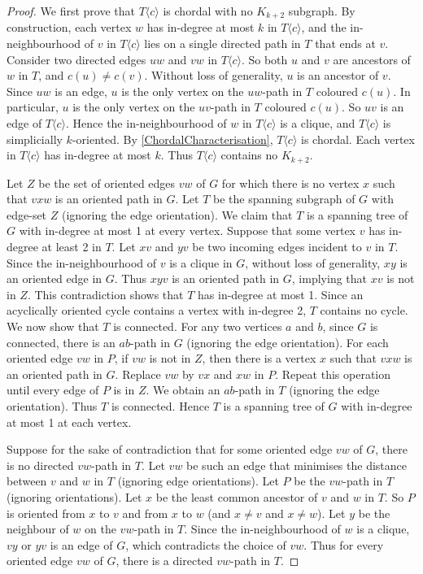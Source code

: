 \documentclass[a4paper,11pt]{article}
\theoremstyle{plain}
\theoremstyle{definition}
\newcommand{\GGG}[2]{#1\langle{#2}\rangle}
\begin{document}
\begin{proof}
We first prove that $\GGG{T}{c}$ is chordal with no $K_{k+2}$ subgraph. By construction, each vertex $w$ has in-degree at most $k$ in $\GGG{T}{c}$, and the in-neighbourhood of $v$ in $\GGG{T}{c}$ lies on a single directed path in $T$ that ends at $v$. Consider two directed edges $uw$ and $vw$ in $\GGG{T}{c}$. So both $u$ and $v$ are ancestors of $w$ in $T$, and $c(u)\neq c(v)$. Without loss of generality, $u$ is an ancestor of $v$. Since $uw$ is an edge, $u$ is the only vertex on the $uw$-path in $T$ coloured $c(u)$. In particular, $u$ is the only vertex on the $uv$-path in $T$ coloured $c(u)$. So $uv$ is an edge of $\GGG{T}{c}$. Hence the in-neighbourhood of $w$ in $\GGG{T}{c}$ is a clique, and $\GGG{T}{c}$ is simplicially $k$-oriented. By \cref{ChordalCharacterisation}, $\GGG{T}{c}$ is chordal. Each vertex in $\GGG{T}{c}$ has in-degree at most $k$. Thus $\GGG{T}{c}$ contains no $K_{k+2}$. 

Let $Z$ be the set of oriented edges $vw$ of $G$ for which there is no vertex $x$ such that $vxw$ is an oriented path in $G$. Let $T$ be the spanning subgraph of $G$ with edge-set $Z$ (ignoring the edge orientation). We claim that $T$ is a spanning tree of $G$ with in-degree at most 1 at every vertex. Suppose that some vertex $v$ has in-degree at least 2 in $T$. Let $xv$ and $yv$ be two incoming edges incident to $v$ in $T$. Since the in-neighbourhood of $v$ is a clique in $G$, without loss of generality, $xy$ is an oriented edge in $G$. Thus $xyv$ is an oriented path in $G$, implying that $xv$ is not in $Z$. This contradiction shows that $T$ has in-degree at most 1. Since an acyclically oriented  cycle contains a vertex with in-degree 2, $T$ contains no cycle. We now show that $T$ is connected. For any two vertices $a$ and $b$, since $G$ is connected, there is an $ab$-path in $G$ (ignoring the edge orientation). For each oriented edge $vw$ in $P$, if $vw$ is not in $Z$, then there is a vertex $x$ such that $vxw$ is an oriented path in $G$. Replace $vw$ by $vx$ and $xw$ in $P$. Repeat this operation until every edge of $P$ is in $Z$. We obtain an $ab$-path in $T$ (ignoring the edge orientation). Thus $T$ is connected. Hence $T$ is a spanning tree of $G$ with in-degree at most 1 at each vertex. 

Suppose for the sake of contradiction that for some oriented edge $vw$ of $G$, there is no directed $vw$-path in $T$. Let $vw$ be such an edge that minimises the distance between $v$ and $w$ in $T$ (ignoring edge orientations). Let $P$ be the $vw$-path in $T$ (ignoring orientations). Let $x$ be the least common ancestor of $v$ and $w$ in $T$. So $P$ is oriented from $x$ to $v$ and from $x$ to $w$ (and $x\neq v$ and $x\neq w$). Let $y$ be the neighbour of $w$ on the $vw$-path in $T$. Since the in-neighbourhood of $w$ is a clique, $vy$ or $yv$ is an edge of $G$, which contradicts the choice of $vw$. Thus for every oriented edge $vw$ of $G$, there is a directed $vw$-path in $T$. 


\end{proof}
\end{document}
